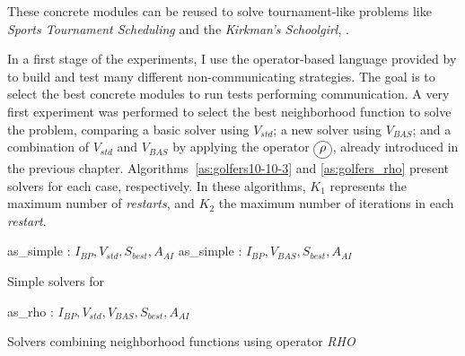 These concrete modules can be  reused to solve tournament-like problems like \textit{Sports Tournament Scheduling} and the \textit{Kirkman's Schoolgirl}, .

In a first stage of the experiments, I use the operator-based language provided by \posl{} to build and test many different non-communicating strategies. The goal is to select the best concrete modules to run tests performing communication. A very first experiment was performed to select the best neighborhood function to solve the problem, comparing a basic solver using $V_{std}$; a new solver using $V_{BAS}$; and a combination of $V_{std}$ and $V_{BAS}$ by applying the operator $\circled{$\rho$}$, already introduced in the previous chapter. Algorithms~\ref{as:golfers10-10-3} and \ref{as:golfers_rho} present solvers for each case, respectively. In these algorithms, $K_1$ represents the maximum number of {\it restarts}, and $K_2$ the maximum number of iterations in each \textit{restart}.

\begin{algorithm}[t]
\dontprintsemicolon
\SetNoline
{}
   as\_simple\;
\algoindent {} : $I_{BP}, V_{std}, S_{best}, A_{AI}$ \;
   as\_simple\;
\algoindent {} : $I_{BP}, V_{BAS}, S_{best}, A_{AI}$ \; 
\caption{Simple solvers for \SGP}\label{as:golfers10-10-3}
\end{algorithm}

\begin{algorithm}[H]
\dontprintsemicolon
\SetNoline
{}
   as\_rho\;
\algoindent {} : $I_{BP}, V_{std}, V_{BAS}, S_{best}, A_{AI}$ \;
\caption{Solvers combining neighborhood functions using operator {\it RHO}}\label{as:golfers_rho}
\end{algorithm}

